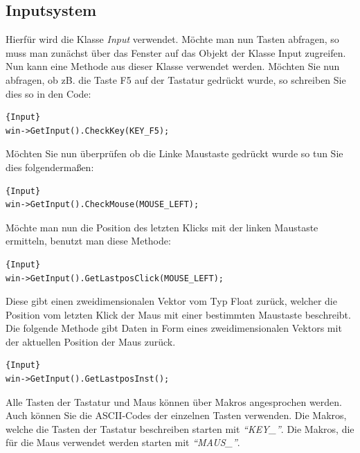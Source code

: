 \subsection{Inputsystem}
\label{inputsystemver}
Hierfür wird die Klasse \textit{Input} verwendet. Möchte man nun Tasten abfragen, so muss man zunächst über das Fenster auf das Objekt der Klasse Input zugreifen. 
Nun kann eine Methode aus dieser Klasse verwendet werden.
Möchten Sie nun abfragen, ob zB. die Taste F5 auf der Tastatur gedrückt wurde, so schreiben Sie dies so in den Code:
\begin{lstlisting}{Input}
win->GetInput().CheckKey(KEY_F5);
\end{lstlisting}
Möchten Sie nun überprüfen ob die Linke Maustaste gedrückt wurde so tun Sie dies folgendermaßen:
\begin{lstlisting}{Input}
win->GetInput().CheckMouse(MOUSE_LEFT);
\end{lstlisting}

Möchte man nun die Position des letzten Klicks mit der linken Maustaste ermitteln, benutzt man diese Methode:
\begin{lstlisting}{Input}
win->GetInput().GetLastposClick(MOUSE_LEFT);
\end{lstlisting}
Diese gibt einen zweidimensionalen Vektor vom Typ Float zurück, welcher die Position vom letzten Klick der Maus mit einer bestimmten Maustaste beschreibt. 
Die folgende Methode gibt Daten in Form eines zweidimensionalen Vektors mit der aktuellen Position der Maus zurück.
\begin{lstlisting}{Input}
win->GetInput().GetLastposInst();
\end{lstlisting}

Alle Tasten der Tastatur und Maus können über Makros angesprochen werden. Auch können Sie die ASCII-Codes der einzelnen Tasten verwenden. Die Makros, welche die Tasten der Tastatur beschreiben starten mit \textit{"`KEY\_"'}. Die Makros, die für die Maus verwendet werden starten mit \textit{"`MAUS\_"'}.
